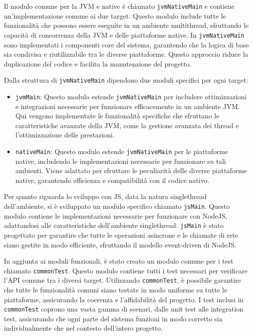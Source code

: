 \documentclass[12pt,a4paper,openright,twoside]{book}
\begin{document}
Il modulo comune per la \ac{JVM} e native è chiamato \texttt{jvmNativeMain} e contiene 
un'implementazione comune ai due target. Questo modulo include tutte le funzionalità che possono essere eseguite in un ambiente multithread, 
sfruttando le capacità di concorrenza della \ac{JVM} e delle piattaforme native. In \texttt{jvmNativeMain} sono implementati i componenti core del sistema, 
garantendo che la logica di base sia condivisa e riutilizzabile tra le diverse piattaforme. Questo approccio riduce la duplicazione 
del codice e facilita la manutenzione del progetto.

Dalla struttura di \texttt{jvmNativeMain} dipendono due moduli specifici per ogni target:
\begin{itemize}
    \item \texttt{jvmMain}: Questo modulo estende \texttt{jvmNativeMain} per includere ottimizzazioni e integrazioni necessarie per funzionare efficacemente in un ambiente \ac{JVM}. Qui vengono implementate le funzionalità specifiche che sfruttano le caratteristiche avanzate della \ac{JVM}, come la gestione avanzata dei thread e l'ottimizzazione delle prestazioni.
    \item \texttt{nativeMain}: Questo modulo estende \texttt{jvmNativeMain} per le piattaforme native, includendo le implementazioni necessarie per funzionare su tali ambienti. Viene adattato per sfruttare le peculiarità delle diverse piattaforme native, garantendo efficienza e compatibilità con il codice nativo.
\end{itemize}

Per quanto riguarda lo sviluppo con \ac{JS}, data la natura singlethread dell'ambiente, si è sviluppato un modulo specifico chiamato \texttt{jsMain}. 
Questo modulo contiene le implementazioni necessarie per funzionare con NodeJS, adattandosi alle caratteristiche dell'ambiente singlethread. \texttt{jsMain} è stato progettato 
per garantire che tutte le operazioni asincrone e le chiamate di rete siano gestite in modo efficiente, sfruttando il modello event-driven di NodeJS.

In aggiunta ai moduli funzionali, è stato creato un modulo comune per i test chiamato \texttt{commonTest}. Questo modulo contiene tutti i test necessari per verificare 
l'API comune tra i diversi target. Utilizzando \texttt{commonTest}, è possibile garantire che tutte le funzionalità comuni siano testate in modo uniforme su tutte le piattaforme, 
assicurando la coerenza e l'affidabilità del progetto. I test inclusi in \texttt{commonTest} coprono una vasta gamma di scenari, dalle unit test alle integration test, assicurando che 
ogni parte del sistema funzioni in modo corretto sia individualmente che nel contesto dell'intero progetto.
\end{document}
